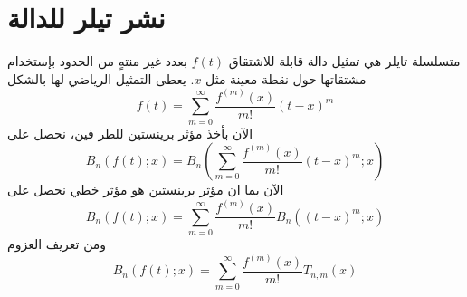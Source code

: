 \section{نشر تيلر للدالة }
متسلسلة تايلر هي تمثيل دالة قابلة للاشتقاق $f(t)$ بعدد غير منتهٍ من الحدود بإستخدام مشتقاتها حول نقطة معينة مثل $x$. يعطى التمثيل الرياضي لها بالشكل 
\[
f(t) = \sum_{m=0}^{\infty} \frac{f^{(m)}(x)}{m!} (t-x)^m
\]
الآن بأخذ مؤثر برينستين للطر فين، نحصل على
\[
B_n(f(t);x) = B_n\left( \sum_{m=0}^{\infty} \frac{f^{(m)}(x)}{m!} (t-x)^m;x\right)
\]
الآن بما ان مؤثر برينستين هو مؤثر خطي نحصل على
\[
B_n(f(t);x) = \sum_{m=0}^{\infty} \frac{f^{(m)}(x)}{m!} B_n\left( (t-x)^m;x\right)
\]
ومن تعريف العزوم 
\[
B_n(f(t);x) = \sum_{m=0}^{\infty} \frac{f^{(m)}(x)}{m!} T_{n, m}(x)
\]
